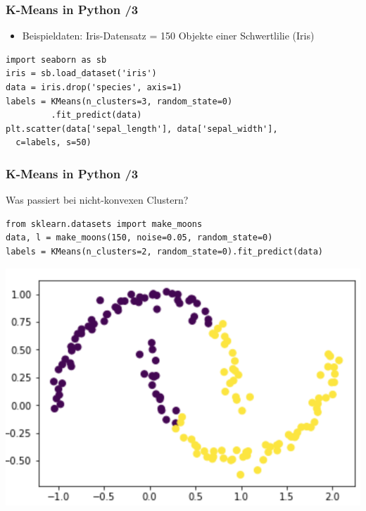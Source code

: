 
\begin{frame}[fragile]
\frametitle{K-Means in Python /3}

\begin{itemize}
\item Beispieldaten: Iris-Datensatz = 150 Objekte einer Schwertlilie (Iris)
\end{itemize}
\begin{verbatim}
import seaborn as sb
iris = sb.load_dataset('iris')
data = iris.drop('species', axis=1)
labels = KMeans(n_clusters=3, random_state=0)
         .fit_predict(data)
plt.scatter(data['sepal_length'], data['sepal_width'],
  c=labels, s=50)
\end{verbatim}
\end{frame}

\begin{frame}[fragile]
\frametitle{K-Means in Python /3}

Was passiert bei nicht-konvexen Clustern?
\begin{verbatim}
from sklearn.datasets import make_moons
data, l = make_moons(150, noise=0.05, random_state=0)
labels = KMeans(n_clusters=2, random_state=0).fit_predict(data)
\end{verbatim}

\vspace*{-.5cm}
\begin{center}
\includegraphics[scale=.5]{fig7/kmeans-moon.png}
\end{center}

\end{frame}

